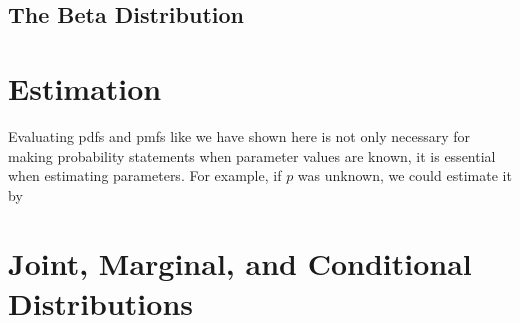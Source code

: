 \subsection{The Beta Distribution}









\section{Estimation}



Evaluating pdfs and pmfs like we have shown here is not only
necessary for making probability statements when parameter values are
known, it is essential when estimating parameters. For example, if $p$
was unknown, we could estimate it by



\section{Joint, Marginal, and Conditional Distributions}

